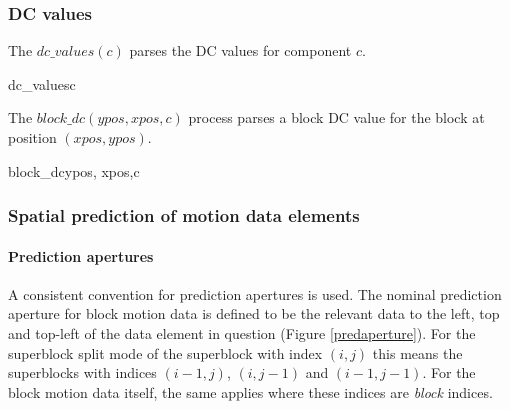 \subsubsection{DC values}
\label{DCvalues}

The $dc\_values(c)$ parses the DC values for component $c$.

\begin{pseudo}{dc\_values}{c}
           \bsEND
        \bsEND
    \bsEND
\bsEND
{}
\end{pseudo}

The $block\_dc(ypos, xpos,c)$ process parses a block DC value for the block at position 
$(xpos, ypos)$.

\begin{pseudo}{block\_dc}{ypos, xpos,c}
\bsIF{\BlockData[ypos][xpos][\RMode]=\Intra}
\bsEND
\end{pseudo}

\subsubsection{Spatial prediction of motion data elements}

\label{spatialprediction}

\paragraph{Prediction apertures}

A consistent convention for prediction apertures is used. The nominal prediction 
aperture for block motion data is defined to be the relevant data to the left, top
and top-left of the data element in question (Figure \ref{predaperture}). For the superblock split mode of 
the superblock with index $(i,j)$ this means the superblocks with indices $(i-1,j)$,
$(i,j-1)$ and $(i-1,j-1)$. For the block motion data itself, the same applies where these
indices are {\em block} indices. 

